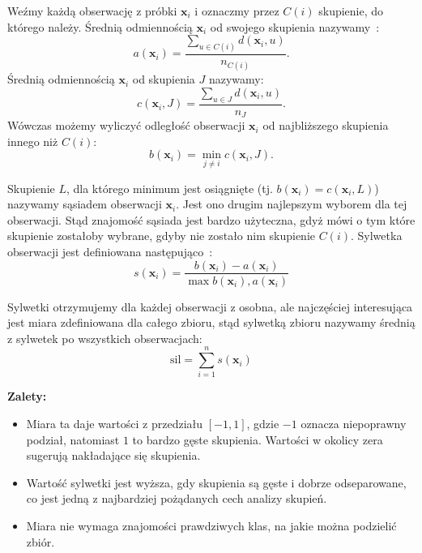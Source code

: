 \documentclass{praca1}
\begin{document}
Weźmy każdą obserwację z próbki $\mathbf{x}_i$ i oznaczmy przez $C(i)$ skupienie, do którego należy. Średnią odmiennością $\mathbf{x}_i$ od swojego skupienia nazywamy~\cite{Rousseeuw1987:silhoutte}:
\begin{equation*}
a(\mathbf{x}_i) = \frac{\sum_{u \in C(i)} d(\mathbf{x}_i, u)}{n_{C(i)}}.
\end{equation*}
Średnią odmiennością $\mathbf{x}_i$ od skupienia $J$ nazywamy:
\begin{equation*}
c(\mathbf{x}_i, J) = \frac{\sum_{u \in J} d(\mathbf{x}_i, u)}{n_{J}}.
\end{equation*}
Wówczas możemy wyliczyć odległość obserwacji $\mathbf{x}_i$ od najbliższego skupienia innego niż $C(i)$:
\begin{equation*}
b(\mathbf{x}_i) = \min\limits_{j \neq i} c(\mathbf{x}_i, J).
\end{equation*}

Skupienie $L$, dla którego minimum jest osiągnięte (tj. $b(\mathbf{x}_i) = c(\mathbf{x}_i, L)$) nazywamy sąsiadem obserwacji $\mathbf{x}_i$. Jest ono drugim najlepszym wyborem dla tej obserwacji. Stąd znajomość sąsiada jest bardzo użyteczna, gdyż mówi o tym które skupienie zostałoby wybrane, gdyby nie zostało nim skupienie $C(i)$. Sylwetka obserwacji jest definiowana następująco~\cite{Rousseeuw1987:silhoutte}:
\begin{equation*}
s(\mathbf{x}_i) = \frac{b(\mathbf{x}_i) - a(\mathbf{x}_i)}{\max{b(\mathbf{x}_i), a(\mathbf{x}_i)}}
\end{equation*}

Sylwetki otrzymujemy dla każdej obserwacji z osobna, ale najczęściej interesująca jest miara zdefiniowana dla całego zbioru, stąd sylwetką zbioru nazywamy średnią z sylwetek po wszystkich obserwacjach:
\begin{equation*}
\mathrm{sil} = \sum\limits_{i=1}^{n}s(\mathbf{x}_i)
\end{equation*}

\textbf{Zalety:}
\begin{itemize}
\item Miara ta daje wartości z przedziału $[-1, 1]$, gdzie $-1$ oznacza niepoprawny podział, natomiast $1$ to bardzo gęste skupienia. Wartości w okolicy zera sugerują nakładające się skupienia.
\item Wartość sylwetki jest wyższa, gdy skupienia są gęste i dobrze odseparowane, co jest jedną z najbardziej pożądanych cech analizy skupień.
\item Miara nie wymaga znajomości prawdziwych klas, na jakie można podzielić zbiór.
\end{itemize}
\end{document}
